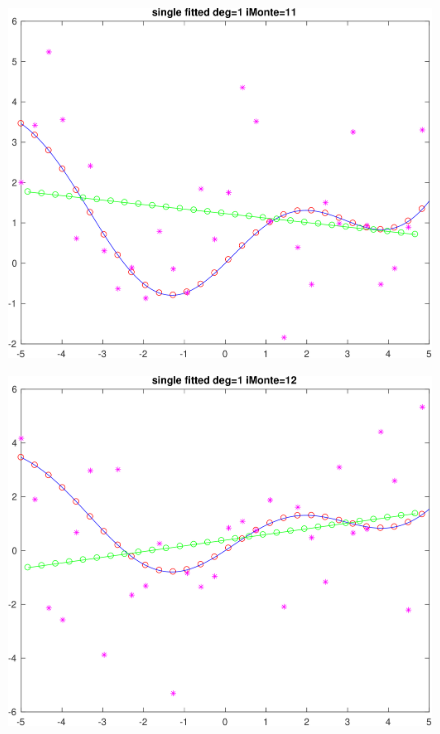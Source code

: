 \documentclass[11pt]{article}
\begin{document}
\begin{figure}[h!]
\centering\includegraphics[scale=0.1]{single_poly_d_1_iMonte_11.png}
\end{figure}


\begin{figure}[h!]
\centering\includegraphics[scale=0.1]{single_poly_d_1_iMonte_12.png}
\end{figure}
\end{document}
